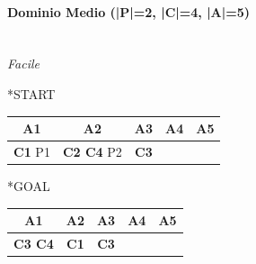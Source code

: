 \documentclass[a4paper,oneside,12pt]{book}
\begin{document}
    \paragraph*{Dominio Medio  (|P|=2, |C|=4, |A|=5)\\\\}

    \noindent \textit{Facile\\}
    \begin{minipage}{0.45\textwidth}

        \begin{center}
            *{START}
            \begin{tabular}{|c | c| c | c | c |}
                \hline
                A1&A2&A3&A4&A5\\
                \hline
                \textbf{C1} P1&\textbf{C2 C4} P2&\textbf{C3}&&\\
                \hline
            \end{tabular}

        \end{center}
    \end{minipage}
    \begin{minipage}{0.45\textwidth}

        \begin{center}
            *{GOAL}
            \begin{tabular}{|c | c| c | c | c |}
                \hline
                A1&A2&A3&A4&A5\\
                \hline
                \textbf{C3 C4}&\textbf{C1}&\textbf{C3}&&\\
                \hline
            \end{tabular}

        \end{center}
    \end{minipage}
\end{document}
